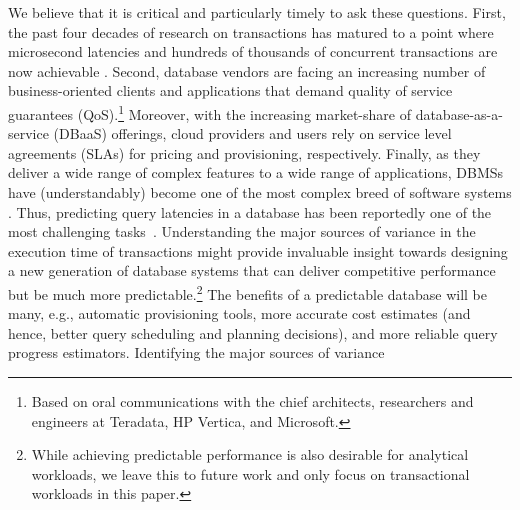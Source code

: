 We believe that it is critical and particularly timely to ask these questions. 
First, the past four decades of research on transactions has matured to a point where  
microsecond latencies and hundreds of thousands of concurrent transactions are now 
achievable \cite{??}.
Second, database vendors are facing an increasing number of business-oriented clients and applications 
that demand
quality of service guarantees (QoS).\footnote{Based on oral communications with the chief architects, researchers and engineers at 
Teradata, HP Vertica, and Microsoft.} 
Moreover, with the increasing market-share of database-as-a-service  (DBaaS) offerings,
cloud providers and users rely on service level agreements (SLAs) for pricing and provisioning, respectively.
Finally, as they deliver 
a wide range of complex features to a wide range of applications,
DBMSs have (understandably) become one of the most complex breed of software systems .
Thus, predicting query latencies in a database has  been reportedly one of the most 
challenging tasks~\cite{??}.
Understanding the major sources of variance in the execution time of transactions might provide 
invaluable insight towards designing a new generation of database systems that can deliver
competitive performance but be much more predictable.\footnote{While achieving
predictable performance is also desirable for analytical workloads, we leave this to future work
and only focus on transactional 
workloads in this paper.} 
The benefits of a predictable database will be many, e.g., automatic provisioning tools, 
more accurate cost estimates (and hence, better query scheduling and planning decisions), 
and more reliable 
query progress estimators. Identifying the major sources of variance 

